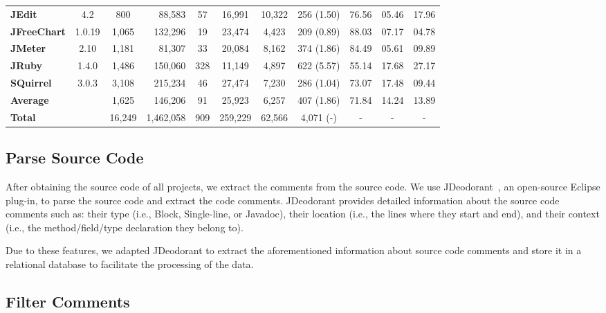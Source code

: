\begin{table}[thb!]
\begin{center}
\begin{tabular}{l| c c r c || c c c || c c c}
            \textbf{JEdit}          & 4.2      &   800 &  88,583 & 57  & 16,991 &  10,322 &    256 (1.50) &  76.56  & 05.46  & 17.96 \\
            \textbf{JFreeChart}     & 1.0.19   & 1,065 & 132,296 & 19  & 23,474 &   4,423 &    209 (0.89) &  88.03  & 07.17  & 04.78 \\
            \textbf{JMeter}         & 2.10     & 1,181 &  81,307 & 33  & 20,084 &   8,162 &    374 (1.86) &  84.49  & 05.61  & 09.89 \\
            \textbf{JRuby}          & 1.4.0    & 1,486 & 150,060 & 328 & 11,149 &   4,897 &    622 (5.57) &  55.14  & 17.68  & 27.17 \\ 
            \textbf{SQuirrel}       & 3.0.3    & 3,108 & 215,234 & 46  & 27,474 &   7,230 &    286 (1.04) &  73.07  & 17.48  & 09.44 \\ 
            \midrule 
            \textbf{Average}        &          &1,625  &146,206  &91   &25,923  & 6,257   & 407 (1.86)    &  71.84  & 14.24  & 13.89 \\ 
            \textbf{Total}          &          &16,249 &1,462,058&909  &259,229 & 62,566  & 4,071 (-)     &  -      & -      & -     \\   
            \bottomrule             
        \end{tabular}
    \end{center}
\end{table}

\subsection{Parse Source Code} 
\label{sub:parse_source_code}

After obtaining the source code of all projects, we extract the comments from the source code. We use JDeodorant~\cite{Tsantalis2008CSMR}, an open-source Eclipse plug-in, to parse the source code and extract the code comments. JDeodorant provides detailed information about the source code comments such as: their type (i.e., Block, Single-line, or Javadoc), their location (i.e., the lines where they start and end), and their context (i.e., the method/field/type declaration they belong to).  

Due to these features, we adapted JDeodorant to extract the aforementioned information about source code comments and store it in a relational database to facilitate the processing of the data. 

\subsection{Filter Comments} 
\label{sub:filter_comments}

